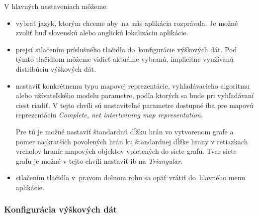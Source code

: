 \documentclass[12pt,a4paper]{report}
\begin{document}
\begin{figure}[h]\centering
{}
\end{figure}

V hlavných nastaveniach môžeme:
\begin{itemize}
    \item vybrať jazyk, ktorým chceme aby~na~nás aplikácia rozprávala. Je možné zvoliť buď slovenskú alebo anglickú lokalizáciu aplikácie.
    \item prejsť stlačením príslušného tlačidla do~konfigurácie výškových dát. Pod týmto tlačidlom môžeme vidieť aktuálne vybranú, implicitne využívanú distribúciu výškových dát.
    \item nastaviť konkrétnemu typu mapovej reprezentácie, vyhľadávacieho algoritmu alebo užívateľského modelu parametre, podľa ktorých sa bude pri vyhľadávaní ciest riadiť. V tejto chvíli sú nastaviteľné parametre dostupné iba pre mapovú reprezentáciu \textit{Complete, net intertwining map representation}. 
    
    Pre tú je možné nastaviť štandardnú dĺžku hrán vo vytvorenom grafe a pomer najkratších povolených hrán ku štandardnej dĺžke hrany v retiazkach vrcholov hraníc mapových objektov vpletených do siete grafu. Tvar siete grafu je možné v tejto chvíli nastaviť ib na \textit{Triangular}. 
    \item stlačením tlačidla v~pravom dolnom rohu sa opäť vrátiť do~hlavného menu aplikácie.
\end{itemize}

\subsubsection{Konfigurácia výškových dát}

\begin{figure}[h]\centering
{}
\end{figure}
\end{document}

